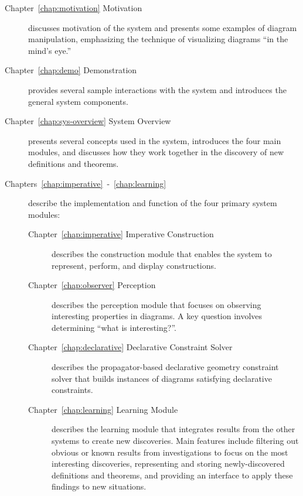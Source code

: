 \begin{description}

\item [Chapter~\ref{chap:motivation} Motivation] discusses motivation
  of the system and presents some examples of diagram manipulation,
  emphasizing the technique of visualizing diagrams ``in the mind's
  eye.''

\item [Chapter~\ref{chap:demo} Demonstration] provides several sample
  interactions with the system and introduces the general system
  components.

\item[Chapter~\ref{chap:sys-overview} System Overview] presents
  several concepts used in the system, introduces the four main
  modules, and discusses how they work together in the discovery of
  new definitions and theorems.

\item[Chapters~\ref{chap:imperative}~-~\ref{chap:learning}] describe
  the implementation and function of the four primary system modules:

\begin{description}
\item[Chapter~\ref{chap:imperative} Imperative Construction]
  describes the construction module that enables the system to
  represent, perform, and display constructions.

\item[Chapter~\ref{chap:observer} Perception] describes the perception
  module that focuses on observing interesting properties in
  diagrams. A key question involves determining ``what is
  interesting?''.

\item[Chapter~\ref{chap:declarative} Declarative Constraint Solver]
  describes the propagator-based declarative geometry constraint
  solver that builds instances of diagrams satisfying declarative
  constraints.

\item[Chapter~\ref{chap:learning} Learning Module] describes the
  learning module that integrates results from the other systems to
  create new discoveries. Main features include filtering out obvious
  or known results from investigations to focus on the most
  interesting discoveries, representing and storing newly-discovered
  definitions and theorems, and providing an interface to apply these
  findings to new situations.

\end{description}
\newpage


\end{description}
